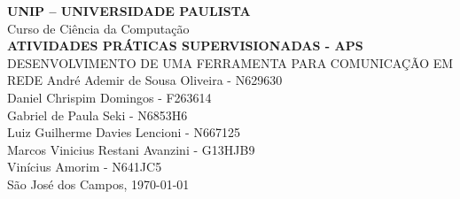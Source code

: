 
\frenchspacing 

\newpage

\pretextual

\begin{capa} 
    \begin{center}
        \begin{minipage}{1\textwidth} 
            \large\centering{}
        \end{minipage}
    \end{center}
    \begin{center}
        \LARGE\textbf{UNIP -- UNIVERSIDADE PAULISTA\\} 
        \LARGE {Curso de Ciência da Computação}\\
        \vfill
        \ABNTEXchapterfont\Large\textbf{\MakeUppercase{ATIVIDADES PRÁTICAS SUPERVISIONADAS - APS}}
        \\\small{DESENVOLVIMENTO DE UMA FERRAMENTA PARA COMUNICAÇÃO EM REDE} 
        \vfill
        \normalsize{
            André Ademir de Sousa Oliveira - N629630\\
            Daniel Chrispim Domingos - F263614\\
            Gabriel de Paula Seki - N6853H6\\
            Luiz Guilherme Davies Lencioni - N667125\\
            Marcos Vinicius Restani Avanzini - G13HJB9\\
            Vinícius Amorim - N641JC5\\
        }
        \vfill
        São José dos Campos, \today 
    \end{center}
\end{capa}

